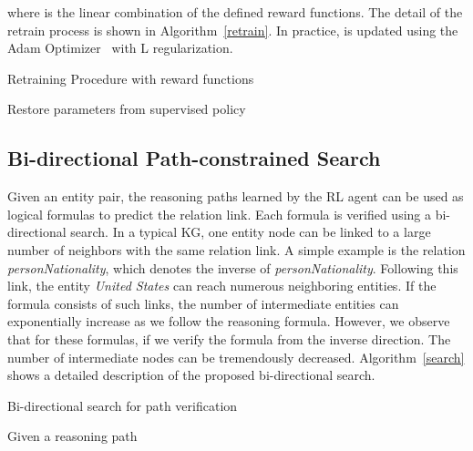 \documentclass[11pt,letterpaper]{article}
\begin{document}
where  is the linear combination of the defined reward functions. The detail of the retrain process is shown in Algorithm~\ref{retrain}. In practice,  is updated using the Adam Optimizer~\cite{kingma2014adam} with L regularization.

\begin{algorithm}[t]
\caption{Retraining Procedure with reward functions}\label{retrain}
Restore parameters  from supervised policy\;
\end{algorithm}

\subsection{Bi-directional Path-constrained Search}
Given an entity pair, the reasoning paths learned by the RL agent can be used as logical formulas to predict the relation link. Each formula is verified using a bi-directional search. In a typical KG, one entity node can be linked to a large number of neighbors with the same relation link. A simple example is the relation \textit{personNationality}, which denotes the inverse of \textit{personNationality}. Following this link, the entity \textit{United States} can reach numerous neighboring entities. If the formula consists of such links, the number of intermediate entities can exponentially increase as we follow the reasoning formula. However, we observe that for these formulas, if we verify the formula from the inverse direction. The number of intermediate nodes can be tremendously decreased. Algorithm~\ref{search} shows a detailed description of the proposed bi-directional search.
\begin{algorithm}[t]
\caption{Bi-directional search for path verification}\label{search}
Given a reasoning path \\
\end{algorithm}
\end{document}
